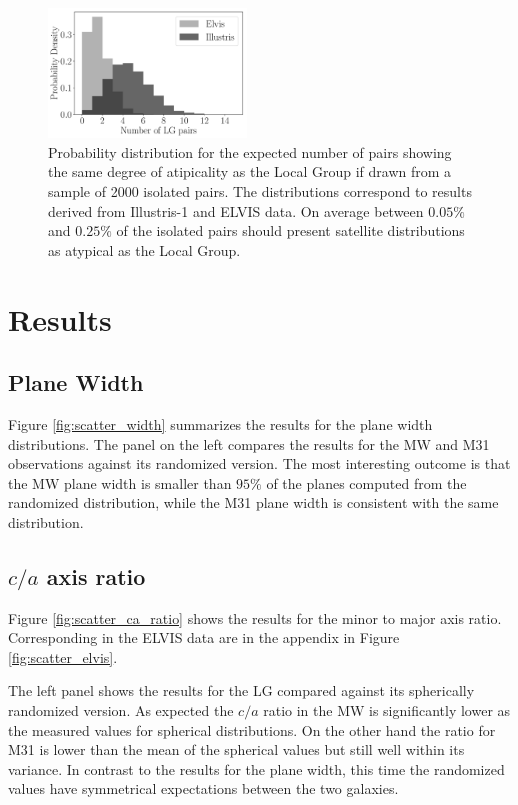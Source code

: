 \documentclass[a4paper,fleqn,usenatbib]{mnras}
\begin{document}
\begin{figure}
\centering
\includegraphics[width=0.47\textwidth]{expected_numbers.pdf}
\caption{Probability distribution for the expected number of pairs
  showing the same degree of atipicality as the Local Group if drawn
  from a sample of 2000 isolated pairs. 
  The distributions correspond to results derived from Illustris-1
  and ELVIS data.
  On average between $0.05\%$ and $0.25\%$ of the isolated pairs should present
  satellite distributions as atypical as the Local Group.
\label{fig:expected_number}}
\end{figure}

\section{Results}
\label{sec:results}


\subsection{Plane Width}

Figure \ref{fig:scatter_width} summarizes the results for the plane
width distributions.
The panel on the left compares the results for the MW and M31
observations against its randomized version. 
The most interesting outcome is that the MW plane width is smaller
than $95\%$ of the planes computed from the randomized distribution,
while the M31 plane width is consistent with the same distribution. 

\subsection{$c/a$ axis ratio}
Figure \ref{fig:scatter_ca_ratio} shows the results for the minor to
major axis ratio. 
Corresponding in the ELVIS data are in the appendix in Figure
\ref{fig:scatter_elvis}.

The left panel shows the results for the LG compared against its
spherically randomized version.
As expected the $c/a$ ratio in the MW is significantly lower as the
measured values for spherical distributions. 
On the other hand the ratio for M31 is lower than the mean of the
spherical values but still well within its variance.
In contrast to the results for the plane width, this time the
randomized values have symmetrical expectations between the two
galaxies.
\end{document}
